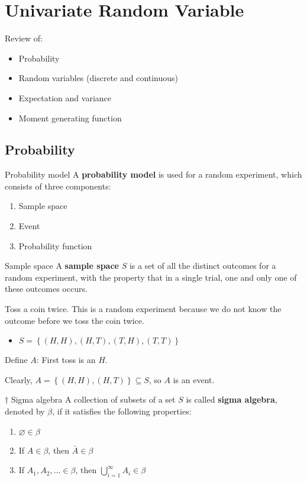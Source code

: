 \setcounter{chapter}{1}
\chapter{Univariate Random Variable}
Review of:
\begin{itemize}
    \item Probability
    \item Random variables (discrete and continuous)
    \item Expectation and variance
    \item Moment generating function
\end{itemize}

\section{Probability}
\begin{Definition}{Probability model}{}
    A \textbf{probability model} is used for a random
    experiment, which consists of three components:
    \begin{enumerate}[label=(\Roman*)]
        \item Sample space
        \item Event
        \item Probability function
    \end{enumerate}
\end{Definition}

\begin{Definition}{Sample space}{}
    A \textbf{sample space} $ S $ is a set of all the distinct outcomes
    for a random experiment, with the property that in a single trial,
    one and only one of these outcomes occurs.
\end{Definition}

\begin{Example}{}{}
    Toss a coin twice. This is a random experiment because
    we do not know the outcome before we toss the coin twice.
    \begin{itemize}
        \item $ S=\left\{ (H,H),(H,T),(T,H),(T,T)\right\} $
    \end{itemize}
    Define $ A $: First toss is an $ H $.

    Clearly, $ A=\left\{ (H,H),(H,T)\right\}\subseteq S $, so $ A $ is an event.
\end{Example}

\begin{Definition}{$ \dagger $ Sigma algebra}{}
    A collection of subsets of a set $ S $ is called \textbf{sigma algebra},
    denoted by $ \beta $, if it satisfies the following properties:
    \begin{enumerate}[label=(\Roman*)]
        \item $ \varnothing\in \beta $
        \item If $ A\in\beta $, then $ \bar{A}\in\beta $
        \item If $ A_1,A_2,\ldots\in \beta $, then $ \bigcup\limits_{i=1}^{\infty}A_i\in \beta $
    \end{enumerate}
\end{Definition}

